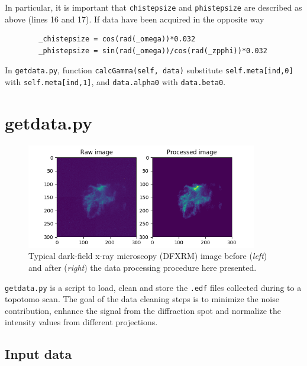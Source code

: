 \documentclass[11pt]{scrartcl}
\begin{document}
In particular, it is important that {\texttt{\textunderscore chistepsize}} and {\texttt{\textunderscore phistepsize}} are described as above (lines 16 and 17). If data have been acquired in the opposite way 

\begin{lstlisting}
        _chistepsize = cos(rad(_omega))*0.032
        _phistepsize = sin(rad(_omega))/cos(rad(_zpphi))*0.032
\end{lstlisting}

In {\texttt{getdata.py}}, function {\texttt{calcGamma(self, data)}} substitute \texttt{self.meta[ind,0]} with \texttt{self.meta[ind,1]}, and \texttt{data.alpha0} with \texttt{data.beta0}.

\section{getdata.py}
\label{sec:getdata}

\begin{figure}[h]
    \centering
    \label{fig:img_array}
    \includegraphics[width=0.9\textwidth]{Raw_processed}
    \caption{Typical dark-field x-ray microscopy ({\footnotesize{DFXRM}}) image before ({\emph{left}}) and after ({\emph{right}}) the data processing procedure here presented.}
    \label{fig:raw_processed}
\end{figure}

{\texttt{getdata.py}} is a script to load, clean and store the {\texttt{.edf}} files collected during to a topotomo scan. The goal of the data cleaning steps is to minimize the noise contribution, enhance the signal from the diffraction spot and normalize the intensity values from different projections.

\subsection{Input data}
\end{document}
